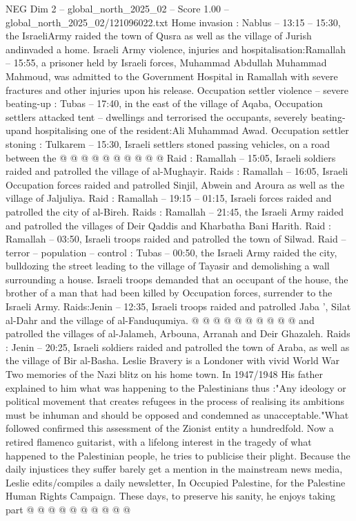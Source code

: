 \begin{textsample}{NEG Dim 2 – global\_north\_2025\_02 – Score 1.00 – global\_north\_2025\_02/121096022.txt}
Home invasion : Nablus -- 13:15 -- 15:30, the IsraeliArmy raided the town of Qusra as well as the village of Jurish andinvaded a home.
Israeli Army violence, injuries and hospitalisation:Ramallah -- 15:55, a prisoner held by Israeli forces, Muhammad Abdullah Muhammad Mahmoud, was admitted to the Government Hospital in Ramallah with severe fractures and other injuries upon his release.
Occupation settler violence -- severe beating-up : Tubas -- 17:40, in the east of the village of Aqaba, Occupation settlers attacked tent -- dwellings and terrorised the occupants, severely beating-upand hospitalising one of the resident:Ali Muhammad Awad.
Occupation settler stoning : Tulkarem -- 15:30, Israeli settlers stoned passing vehicles, on a road between the @ @ @ @ @ @ @ @ @ @ Raid : Ramallah -- 15:05, Israeli soldiers raided and patrolled the village of al-Mughayir.
Raids : Ramallah -- 16:05, Israeli Occupation forces raided and patrolled Sinjil, Abwein and Aroura as well as the village of Jaljuliya.
Raid : Ramallah -- 19:15 -- 01:15, Israeli forces raided and patrolled the city of al-Bireh.
Raids : Ramallah -- 21:45, the Israeli Army raided and patrolled the villages of Deir Qaddis and Kharbatha Bani Harith.
Raid : Ramallah -- 03:50, Israeli troops raided and patrolled the town of Silwad.
Raid -- terror -- population -- control : Tubas -- 00:50, the Israeli Army raided the city, bulldozing the street leading to the village of Tayasir and demolishing a wall surrounding a house.
Israeli troops demanded that an occupant of the house, the brother of a man that had been killed by Occupation forces, surrender to the Israeli Army.
Raids:Jenin -- 12:35, Israeli troops raided and patrolled Jaba ', Silat al-Dahr and the village of al-Fanduqumiya. @ @ @ @ @ @ @ @ @ @ and patrolled the villages of al-Jalameh, Arbouna, Arranah and Deir Ghazaleh.
Raids : Jenin -- 20:25, Israeli soldiers raided and patrolled the town of Araba, as well as the village of Bir al-Basha.
Leslie Bravery is a Londoner with vivid World War Two memories of the Nazi blitz on his home town.
In 1947/1948 His father explained to him what was happening to the Palestinians thus :"Any ideology or political movement that creates refugees in the process of realising its ambitions must be inhuman and should be opposed and condemned as unacceptable."What followed confirmed this assessment of the Zionist entity a hundredfold.
Now a retired flamenco guitarist, with a lifelong interest in the tragedy of what happened to the Palestinian people, he tries to publicise their plight.
Because the daily injustices they suffer barely get a mention in the mainstream news media, Leslie edits/compiles a daily newsletter, In Occupied Palestine, for the Palestine Human Rights Campaign.
These days, to preserve his sanity, he enjoys taking part @ @ @ @ @ @ @ @ @ @

\end{textsample}
